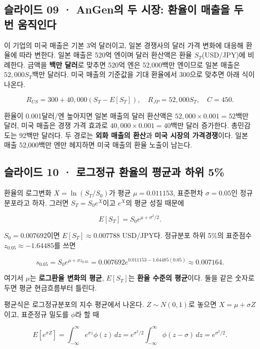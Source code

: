\documentclass[11pt,a4paper]{article}
\begin{document}
\subsection{슬라이드 09 · AnGen의 두 시장: 환율이 매출을 두 번 움직인다}
이 기업의 미국 매출은 기본 3억 달러이고, 일본 경쟁사의 달러 가격 변화에 대응해 환율에 따라 변한다. 일본 매출은 520억 엔이며 달러 환산액은 환율 $S_T$(USD/JPY)에 비례한다. 금액을 \textbf{백만 달러}로 맞추면 520억 엔은 52,000백만 엔이므로 일본 매출은 $52{,}000S_T$백만 달러다. 미국 매출의 기준값을 기대 환율에서 300으로 맞추면 아래 식이 나온다.\par

\[
R_{US}=300+40{,}000(S_T-E[S_T]),\quad
R_{JP}=52{,}000S_T,\quad C=450.
\]

환율이 0.001달러/엔 높아지면 일본 매출의 달러 환산액은 $52{,}000\times0.001=52$백만 달러, 미국 매출은 경쟁 가격 효과로 $40{,}000\times0.001=40$백만 달러 증가한다. 총민감도는 92백만 달러다. 두 경로는 \textbf{외화 매출의 환산}과 \textbf{미국 시장의 가격경쟁}이다. 일본 매출 52,000백만 엔만 헤지하면 미국 매출의 환율 노출이 남는다.\par

\subsection{슬라이드 10 · 로그정규 환율의 평균과 하위 5\%}
환율의 로그변화 $X=\ln(S_T/S_0)$가 평균 $\mu=0.011153$, 표준편차 $\sigma=0.05$인 정규분포라고 하자. 그러면 $S_T=S_0e^X$이고 $e^X$의 평균 성질 때문에\par

\[
E[S_T]=S_0e^{\mu+\sigma^2/2}.
\]

$S_0=0.007692$이면 $E[S_T]\approx0.007788$ USD/JPY다. 정규분포 하위 5\%의 표준점수 $z_{0.05}\approx-1.64485$를 쓰면\par

\[
s_{0.05}=S_0e^{\mu+\sigma z_{0.05}}
=0.007692e^{0.011153-1.64485(0.05)}\approx0.007164.
\]

여기서 $\mu$는 \textbf{로그환율 변화의 평균}, $E[S_T]$는 \textbf{환율 수준의 평균}이다. 둘을 같은 숫자로 두면 평균 현금흐름부터 틀린다.\par

평균식은 로그정규분포의 지수 평균에서 나온다. $Z\sim N(0,1)$로 놓으면 $X=\mu+\sigma Z$이고, 표준정규 밀도를 $\phi$라 할 때\par

\[
E[e^{\sigma Z}]=\int_{-\infty}^{\infty}e^{\sigma z}\phi(z)\,dz
=e^{\sigma^2/2}\int_{-\infty}^{\infty}\phi(z-\sigma)\,dz
=e^{\sigma^2/2}.
\]
\end{document}
